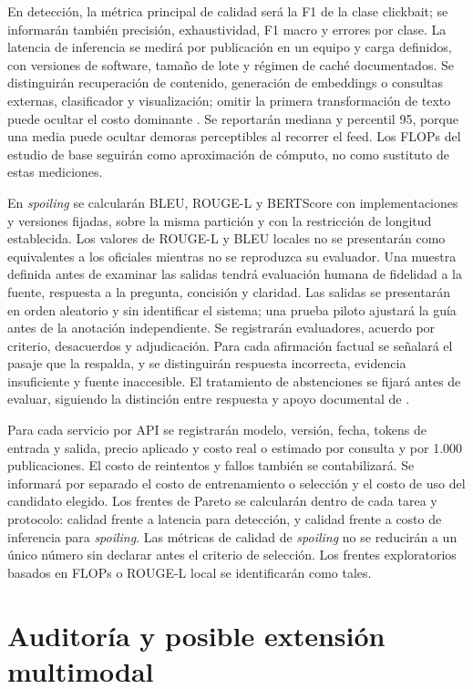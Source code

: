 En detección, la métrica principal de calidad será la F1 de la clase clickbait; se informarán también precisión, exhaustividad, F1 macro y errores por clase. La latencia de inferencia se medirá por publicación en un equipo y carga definidos, con versiones de software, tamaño de lote y régimen de caché documentados. Se distinguirán recuperación de contenido, generación de embeddings o consultas externas, clasificador y visualización; omitir la primera transformación de texto puede ocultar el costo dominante \citep{kuntur2026quick}. Se reportarán mediana y percentil 95, porque una media puede ocultar demoras perceptibles al recorrer el feed. Los FLOPs del estudio de base seguirán como aproximación de cómputo, no como sustituto de estas mediciones.

En \emph{spoiling} se calcularán BLEU, ROUGE-L y BERTScore con implementaciones y versiones fijadas, sobre la misma partición y con la restricción de longitud establecida. Los valores de ROUGE-L y BLEU locales no se presentarán como equivalentes a los oficiales mientras no se reproduzca su evaluador. Una muestra definida antes de examinar las salidas tendrá evaluación humana de fidelidad a la fuente, respuesta a la pregunta, concisión y claridad. Las salidas se presentarán en orden aleatorio y sin identificar el sistema; una prueba piloto ajustará la guía antes de la anotación independiente. Se registrarán evaluadores, acuerdo por criterio, desacuerdos y adjudicación. Para cada afirmación factual se señalará el pasaje que la respalda, y se distinguirán respuesta incorrecta, evidencia insuficiente y fuente inaccesible. El tratamiento de abstenciones se fijará antes de evaluar, siguiendo la distinción entre respuesta y apoyo documental de \citet{sorodoc2025garage}.

Para cada servicio por API se registrarán modelo, versión, fecha, tokens de entrada y salida, precio aplicado y costo real o estimado por consulta y por 1.000 publicaciones. El costo de reintentos y fallos también se contabilizará. Se informará por separado el costo de entrenamiento o selección y el costo de uso del candidato elegido. Los frentes de Pareto se calcularán dentro de cada tarea y protocolo: calidad frente a latencia para detección, y calidad frente a costo de inferencia para \emph{spoiling}. Las métricas de calidad de \emph{spoiling} no se reducirán a un único número sin declarar antes el criterio de selección. Los frentes exploratorios basados en FLOPs o ROUGE-L local se identificarán como tales.

\section{Auditoría y posible extensión multimodal}

